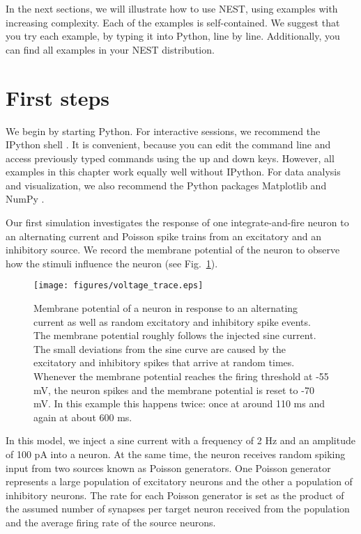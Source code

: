 \documentclass{article}
\begin{document}
In the next sections, we will illustrate how to use NEST, using
examples with increasing complexity. Each of the examples is
self-contained. We suggest that you try each example, by typing it
into Python, line by line. Additionally, you can find all examples in
your NEST distribution.

\section{First steps}

We begin by starting Python. For interactive sessions, we recommend
the IPython shell \citep{Pere:2007(21)}. It is convenient,
because you can edit the command line and access previously typed
commands using the up and down keys. However, all examples in this
chapter work equally well without IPython. For data analysis and
visualization, we also recommend the Python packages Matplotlib
\citep{Hunt:2007(90)} and NumPy \citep{Olip:Guid}.

Our first simulation investigates the response of one
integrate-and-fire neuron to an alternating current and Poisson spike
trains from an excitatory and an inhibitory source. We record the
membrane potential of the neuron to observe how the stimuli influence
the neuron (see Fig.~\ref{nest:fig:voltagetrace}).

\begin{figure}[!tbp]
\centering
\texttt{[image: figures/voltage\_trace.eps]}
\caption{\label{nest:fig:voltagetrace} Membrane potential of a neuron
  in response to an alternating current as well as random excitatory
  and inhibitory spike events. The membrane potential roughly follows
  the injected sine current. The small deviations from the sine curve are
  caused by the excitatory and inhibitory spikes that arrive at random
  times. Whenever the membrane potential reaches the firing threshold
  at -55 mV, the neuron spikes and the membrane potential is reset to
  -70 mV. In this example this happens twice: once at around 110 ms
  and again at about 600 ms.}
\end{figure}

In this model, we inject a sine current with a frequency of 2 Hz and
an amplitude of 100 pA into a neuron. At the same time, the neuron
receives random spiking input from two sources known as Poisson
generators. One Poisson generator represents a large population of
excitatory neurons and the other a population of inhibitory
neurons. The rate for each Poisson generator is set as the product of
the assumed number of synapses per target neuron received from the 
population and the average firing rate of the source neurons.
\end{document}
